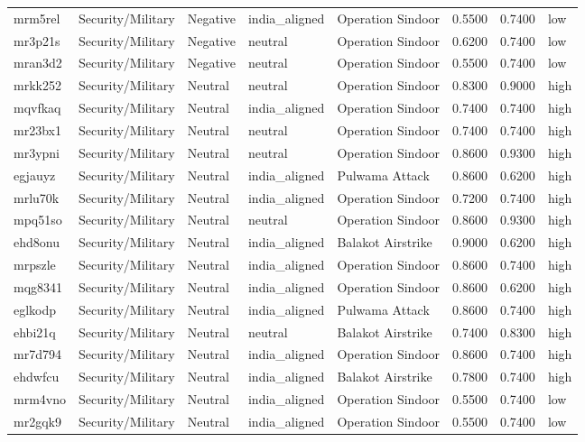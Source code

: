 \begin{longtable}{lllllrrl}
mrm5rel & Security/Military & Negative & india\_aligned & Operation Sindoor & 0.5500 & 0.7400 & low \\
mr3p21s & Security/Military & Negative & neutral & Operation Sindoor & 0.6200 & 0.7400 & low \\
mran3d2 & Security/Military & Negative & neutral & Operation Sindoor & 0.5500 & 0.7400 & low \\
mrkk252 & Security/Military & Neutral & neutral & Operation Sindoor & 0.8300 & 0.9000 & high \\
mqvfkaq & Security/Military & Neutral & india\_aligned & Operation Sindoor & 0.7400 & 0.7400 & high \\
mr23bx1 & Security/Military & Neutral & neutral & Operation Sindoor & 0.7400 & 0.7400 & high \\
mr3ypni & Security/Military & Neutral & neutral & Operation Sindoor & 0.8600 & 0.9300 & high \\
egjauyz & Security/Military & Neutral & india\_aligned & Pulwama Attack & 0.8600 & 0.6200 & high \\
mrlu70k & Security/Military & Neutral & india\_aligned & Operation Sindoor & 0.7200 & 0.7400 & high \\
mpq51so & Security/Military & Neutral & neutral & Operation Sindoor & 0.8600 & 0.9300 & high \\
ehd8onu & Security/Military & Neutral & india\_aligned & Balakot Airstrike & 0.9000 & 0.6200 & high \\
mrpszle & Security/Military & Neutral & india\_aligned & Operation Sindoor & 0.8600 & 0.7400 & high \\
mqg8341 & Security/Military & Neutral & india\_aligned & Operation Sindoor & 0.8600 & 0.6200 & high \\
eglkodp & Security/Military & Neutral & india\_aligned & Pulwama Attack & 0.8600 & 0.7400 & high \\
ehbi21q & Security/Military & Neutral & neutral & Balakot Airstrike & 0.7400 & 0.8300 & high \\
mr7d794 & Security/Military & Neutral & india\_aligned & Operation Sindoor & 0.8600 & 0.7400 & high \\
ehdwfcu & Security/Military & Neutral & india\_aligned & Balakot Airstrike & 0.7800 & 0.7400 & high \\
mrm4vno & Security/Military & Neutral & india\_aligned & Operation Sindoor & 0.5500 & 0.7400 & low \\
mr2gqk9 & Security/Military & Neutral & india\_aligned & Operation Sindoor & 0.5500 & 0.7400 & low \\

\end{longtable}
